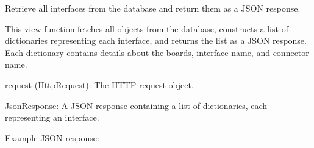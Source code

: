 \documentclass[letterpaper,10pt,english]{sphinxmanual}
\begin{document}

\begin{fulllineitems}
\label{\detokenize{app:app.views.get_interfaces}}
\pysigstartsignatures
{}
\pysigstopsignatures
\sphinxAtStartPar
Retrieve all interfaces from the database and return them as a JSON response.

\sphinxAtStartPar
This view function fetches all  objects from the database, constructs 
a list of dictionaries representing each interface, and returns the list as a JSON response. 
Each dictionary contains details about the boards, interface name, and connector name.
\begin{description}
\sphinxAtStartPar
request (HttpRequest): The HTTP request object.

\sphinxAtStartPar
JsonResponse: A JSON response containing a list of dictionaries, each representing an interface.

\sphinxAtStartPar
Example JSON response:

\begin{sphinxVerbatim}[commandchars=\\\{\}]
\PYG{p}{[}
\PYG{p}{]}
\end{sphinxVerbatim}


\end{description}
\end{fulllineitems}
\end{document}
